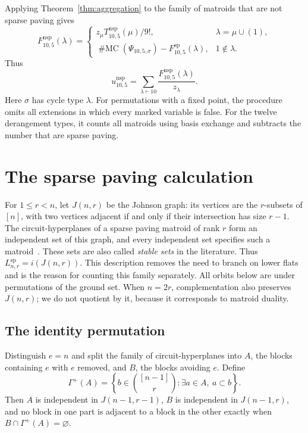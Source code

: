 \documentclass[11pt]{article}
\theoremstyle{definition}
\newcommand{\SP}{\mathrm{sp}}
\newcommand{\nsp}{\mathrm{nsp}}
\newcommand{\mc}{\operatorname{\#MC}}
\begin{document}
Applying Theorem~\ref{thm:aggregation} to the family of matroids that are
not sparse paving gives
\begin{equation}\label{eq:nsp-fixed}
F^{\nsp}_{10,5}(\lambda)=
\begin{cases}
z_\mu T^{\nsp}_{10,5}(\mu)/9!,&\lambda=\mu\cup(1),\\
\mc(\Psi_{10,5,\sigma})-F^{\SP}_{10,5}(\lambda),&1\notin\lambda.
\end{cases}
\end{equation}
Thus
\begin{equation}\label{eq:nsp-total}
u^{\nsp}_{10,5}=\sum_{\lambda\vdash10}
                  \frac{F^{\nsp}_{10,5}(\lambda)}{z_\lambda}.
\end{equation}
Here $\sigma$ has cycle type $\lambda$. For permutations with a fixed point,
the procedure omits all extensions in which every marked variable is false.
For the twelve derangement types, it counts all matroids using basis exchange
and subtracts the number that are sparse paving.

\section{The sparse paving calculation}\label{sec:sparse}

For $1\le r<n$, let $J(n,r)$ be the Johnson graph: its vertices are the
$r$-subsets of $[n]$, with two vertices adjacent if and only if their
intersection has size $r-1$. The circuit-hyperplanes of a sparse paving
matroid of rank $r$ form an independent set of this graph, and every
independent set specifies such a matroid~\cite{MR,PvdP}.
These sets are also called \emph{stable sets} in the literature. Thus
$L^{\SP}_{n,r}=i(J(n,r))$. This description removes the need to branch on
lower flats and is the reason for counting this family separately.
All orbits below are under permutations of the ground set. When $n=2r$,
complementation also preserves $J(n,r)$; we do not quotient by it, because
it corresponds to matroid duality.

\subsection{The identity permutation}

Distinguish $e=n$ and split the family of circuit-hyperplanes into $A$, the blocks
containing $e$ with $e$ removed, and $B$, the blocks avoiding $e$.
Define
\[
\Gamma^+(A)=\left\{b\in\binom{[n-1]}r:\exists a\in A,\ a\subset b\right\}.
\]
Then $A$ is independent in $J(n-1,r-1)$, $B$ is independent in $J(n-1,r)$,
and no block in one part is adjacent to a block in the other exactly when
$B\cap\Gamma^+(A)=\varnothing$.
\end{document}
